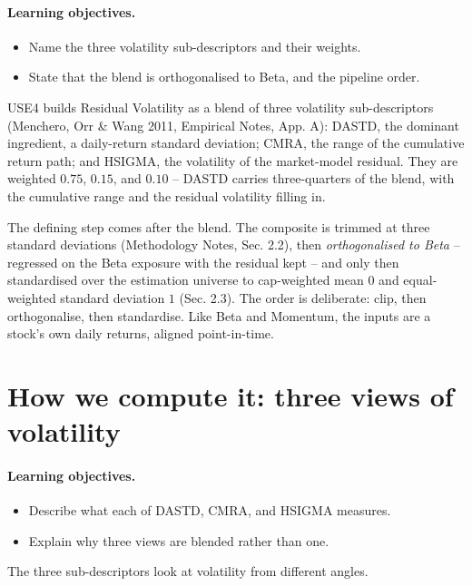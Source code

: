 \documentclass[11pt]{article}
\theoremstyle{definition}
\theoremstyle{plain}
\theoremstyle{remark}
\begin{document}
\paragraph{Learning objectives.}
\begin{itemize}[leftmargin=1.4em,topsep=2pt]
  \item Name the three volatility sub-descriptors and their weights.
  \item State that the blend is orthogonalised to Beta, and the pipeline order.
\end{itemize}

USE4 builds Residual Volatility as a blend of three volatility sub-descriptors (Menchero, Orr \& Wang 2011, Empirical Notes, App. A): DASTD, the dominant ingredient, a daily-return standard deviation; CMRA, the range of the cumulative return path; and HSIGMA, the volatility of the market-model residual. They are weighted $0.75$, $0.15$, and $0.10$ -- DASTD carries three-quarters of the blend, with the cumulative range and the residual volatility filling in.

The defining step comes after the blend. The composite is trimmed at three standard deviations (Methodology Notes, Sec. 2.2), then \emph{orthogonalised to Beta} -- regressed on the Beta exposure with the residual kept -- and only then standardised over the estimation universe to cap-weighted mean $0$ and equal-weighted standard deviation $1$ (Sec. 2.3). The order is deliberate: clip, then orthogonalise, then standardise. Like Beta and Momentum, the inputs are a stock's own daily returns, aligned point-in-time.

\section{How we compute it: three views of volatility}\label{sec:compute}

\paragraph{Learning objectives.}
\begin{itemize}[leftmargin=1.4em,topsep=2pt]
  \item Describe what each of DASTD, CMRA, and HSIGMA measures.
  \item Explain why three views are blended rather than one.
\end{itemize}

The three sub-descriptors look at volatility from different angles.
\end{document}
